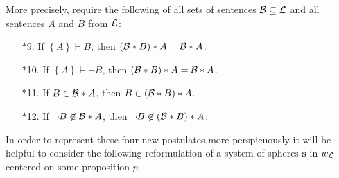 More precisely, \citet{dp97} require the following of all sets of sentences $\cal B\subseteq L$ and all sentences $A$ and $B$ from $\cal L$:
\begin{enumerate}
\item[$*$9.] If $\left\{A\right\}\vdash B$, then $\left(\begin{cal}B\end{cal}*B\right)*A=\begin{cal}B\end{cal}*A$.
\item[$*$10.] If $\left\{A\right\}\vdash\neg B$, then $\left(\begin{cal}B\end{cal}*B\right)*A=\begin{cal}B\end{cal}*A$.
\item[$*$11.] If $B\in\begin{cal}B\end{cal}*A$, then $B\in\left(\begin{cal}B\end{cal}*B\right)*A$.
\item[$*$12.] If $\neg B\not\in\begin{cal}B\end{cal}*A$, then $\neg B\not\in\left(\begin{cal}B\end{cal}*B\right)*A$.
\end{enumerate}
In order to represent these four new postulates more perspicuously it will be helpful to consider the following reformulation of a system of spheres $\textbf{s}$ in $w_{\cal L}$ centered on some proposition $p$.

